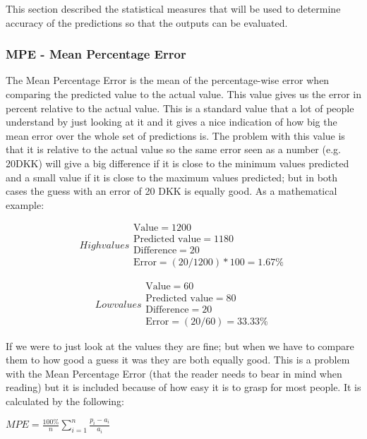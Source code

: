 This section described the statistical measures that will be used to determine accuracy of the predictions so that the outputs can be evaluated.

\subsubsection{MPE - Mean Percentage Error}
The Mean Percentage Error is the mean of the percentage-wise error when comparing the predicted value to the actual value. This value gives us the error in percent relative to the actual value. This is a standard value that a lot of people understand by just looking at it and it gives a nice indication of how big the mean error over the whole set of predictions is. The problem with this value is that it is relative to the actual value so the same error seen as a number (e.g. 20DKK) will give a big difference if it is close to the minimum values predicted and a small value if it is close to the maximum values predicted; but in both cases the guess with an error of 20 DKK is equally good. As a mathematical example:


\begin{subequations}
High values
\begin{align}
 \text{Value} = 1200 \\
 \text{Predicted value} = 1180\\
 \text{Difference} = 20\\
 \text{Error} = (20/1200)*100 = 1.67\%
\end{align}
\end{subequations}

\begin{subequations}
Low values
\begin{align}
 \text{Value} = 60 \\
 \text{Predicted value} = 80\\
 \text{Difference} = 20\\
 \text{Error} = (20/60) = 33.33\%
\end{align}
\end{subequations}


If we were to just look at the values they are fine; but when we have to compare them to how good a guess it was they are both equally good. This is a problem with the Mean Percentage Error (that the reader needs to bear in mind when reading) but it is included because of how easy it is to grasp for most people.
It is calculated by the following:

\centerline{$ MPE = \frac{100\%}{n}\sum_{i=1}^{n}\frac{p_i - a_i}{a_i} $}

